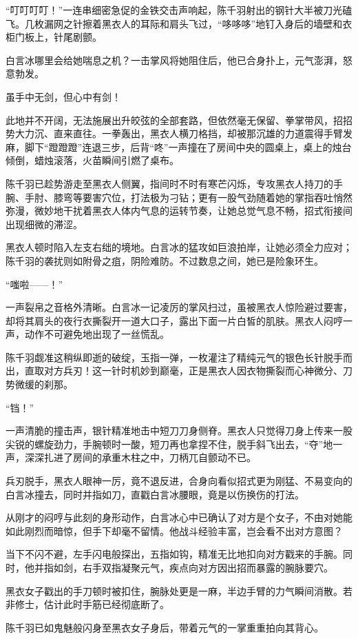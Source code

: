 “叮叮叮叮！”一连串细密急促的金铁交击声响起，陈千羽射出的钢针大半被刀光磕飞。几枚漏网之针擦着黑衣人的耳际和肩头飞过，“哆哆哆”地钉入身后的墙壁和衣柜门板上，针尾剧颤。

白言冰哪里会给她喘息之机？一击掌风将她阻住后，他已合身扑上，元气澎湃，怒意勃发。

虽手中无剑，但心中有剑！

此地并不开阔，无法施展出升皎弦的全部套路，但依然毫无保留、拳掌带风，招招势大力沉、直来直往。一拳轰出，黑衣人横刀格挡，却被那沉雄的力道震得手臂发麻，脚下“蹬蹬蹬”连退三步，后背“咚”一声撞在了房间中央的圆桌上，桌上的烛台倾倒，蜡烛滚落，火苗瞬间引燃了桌布。

陈千羽已趁势游走至黑衣人侧翼，指间时不时有寒芒闪烁，专攻黑衣人持刀的手腕、手肘、膝弯等要害穴位，打法极为刁钻；更有一股气劲随着她的掌指吞吐悄然弥漫，微妙地干扰着黑衣人体内气息的运转节奏，让她总觉气息不畅，招式衔接间出现细微的滞涩。

黑衣人顿时陷入左支右绌的境地。白言冰的猛攻如巨浪拍岸，让她必须全力应对；陈千羽的袭扰则如附骨之疽，阴险难防。不过数息之间，她已是险象环生。

“嗤啦——！”

一声裂帛之音格外清晰。白言冰一记凌厉的掌风扫过，虽被黑衣人惊险避过要害，却将其肩头的夜行衣撕裂开一道大口子，露出下面一片白皙的肌肤。黑衣人闷哼一声，动作不可避免地出现了一丝慌乱。

陈千羽觑准这稍纵即逝的破绽，玉指一弹，一枚灌注了精纯元气的银色长针脱手而出，直取对方兵刃！这一针时机妙到巅毫，正是黑衣人因衣物撕裂而心神微分、刀势微缓的刹那。

“铛！”

一声清脆的撞击声，银针精准地击中短刀刀身侧脊。黑衣人只觉得刀身上传来一股尖锐的螺旋劲力，手腕顿时一酸，短刀再也拿捏不住，脱手斜飞出去，“夺”地一声，深深扎进了房间的承重木柱之中，刀柄兀自颤动不已。

兵刃脱手，黑衣人眼神一厉，竟不退反进，合身向看似招式更为刚猛、不易变向的白言冰撞去，同时并指如刀，直戳白言冰腰眼，竟是以伤换伤的打法。

从刚才的闷哼与此刻的身形动作，白言冰心中已确认了对方是个女子，不由对她能如此刚烈而暗惊，但手下却毫不留情。他战斗经验丰富，岂会看不出对方意图？

当下不闪不避，左手闪电般探出，五指如钩，精准无比地扣向对方戳来的手腕。同时，他并指如剑，右手双指凝聚元气，疾点向对方因出招而暴露的腕脉要穴。

黑衣女子戳出的手刀顿时被扣住，腕脉处更是一麻，半边手臂的力气瞬间消散。若非修士，估计此时手筋已经彻底断了。

陈千羽已如鬼魅般闪身至黑衣女子身后，带着元气的一掌重重拍向其背心。

